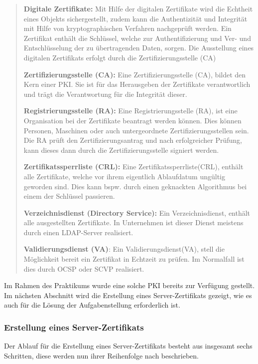 \documentclass[
a4paper,     %
 headsepline, %
footsepline, %
titlepage,   %
 halfparskip,     %
 fleqn,       %
12pt         %
]{scrartcl}  %
\begin{document}
\begin{quotation}
\item [\textbf{Digitale Zertifikate:}]
Mit Hilfe der digitalen Zertifikate wird die Echtheit eines Objekts sichergestellt, zudem kann die Authentizität und Integrität mit Hilfe von kryptographischen Verfahren nachgeprüft werden. Ein Zertifikat enthält die Schlüssel, welche zur Authentifizierung und Ver- und Entschlüsselung der zu übertragenden Daten, sorgen. Die Ausstellung eines digitalen Zertifikats erfolgt durch die Zertifizierungsstelle (CA)
\item [\textbf{Zertifizierungsstelle (CA):}]Eine Zertifizierungsstelle (CA), bildet den Kern einer PKI. Sie ist für das Herausgeben der Zertifikate verantwortlich und trägt die Verantwortung für die Integrität dieser. 
\item [\textbf{Registrierungsstelle (RA):}]Eine Registrierungsstelle (RA), ist eine Organisation bei der Zertifikate beantragt werden können. Dies können Personen, Maschinen oder auch untergeordnete Zertifizierungsstellen sein. Die RA prüft den Zertifizierungsantrag und nach erfolgreicher Prüfung, kann dieses dann durch die Zertifizierungsstelle signiert werden. 
\item [\textbf{Zertifikatssperrliste (CRL):}] Eine Zertifikatssperrliste(CRL), enthält alle Zertifikate, welche vor ihrem eigentlich Ablaufdatum ungültig geworden sind. Dies kann bspw. durch einen geknackten Algorithmus bei einem der Schlüssel passieren. 
\item [\textbf{Verzeichnisdienst (Directory Service):}] Ein Verzeichnisdienst, enthält alle ausgestellten Zertifikate. In Unternehmen ist dieser Dienst meistens durch einen LDAP-Server realisiert. 
\item [\textbf{Validierungsdienst (VA)}:] Ein Validierungsdienst(VA), stell die Möglichkeit bereit ein Zertifikat in Echtzeit zu prüfen. Im Normalfall ist dies durch OCSP oder SCVP realisiert.  
\end{quotation}

Im Rahmen des Praktikums wurde eine solche PKI bereits zur Verfügung gestellt. Im nächsten Abschnitt wird die Erstellung eines Server-Zertifikats gezeigt, wie es auch für die Lösung der Aufgabenstellung erforderlich ist. 
\subsubsection{Erstellung eines Server-Zertifikats}
Der Ablauf für die Erstellung eines Server-Zertifikats besteht aus insgesamt sechs Schritten, diese werden nun ihrer Reihenfolge nach beschrieben. 
\end{document}
